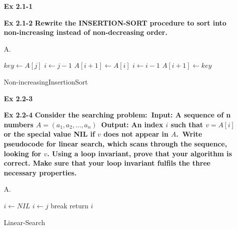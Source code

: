 \documentclass[fontsize=12pt,paper=a4,open=any]{book}
\begin{document}
\begin{enumerate}
	\item[\textbf{Ex 2.1-1}]

	\item[\textbf{Ex 2.1-2}]
		\textbf{Rewrite the INSERTION-SORT procedure to sort into non-increasing instead of non-decreasing order.} \

	\item[A.]
		\begin{algorithm}[H]

			\DontPrintSemicolon

			{
				$key\longleftarrow A[j]$\;
				$i \longleftarrow j-1$\;
				{
					$A[i+ 1] \longleftarrow A[i]$\;
					$i \longleftarrow i-1$\;
				}
				$A[i+ 1] \longleftarrow key$\;
			}

			\caption{Non-increasingInsertionSort}
		\end{algorithm}
	\item[\textbf{Ex 2.2-3}]
	
	\item[\textbf{Ex 2.2-4}]
		\textbf{Consider the searching problem:\
			Input: A sequence of n numbers $A =(a_1, a_2,\dots,a_n)$\
			Output: An index $i$ such that $v=A[i]$ or the special value NIL if $v$ does not appear in $A$.\
			Write pseudocode for linear search, which scans through the sequence, looking for $v$. Using a loop invariant, prove that your algorithm is correct. Make sure that your loop invariant fulfils the three necessary properties.
		}
	
	\item[A.]
		\begin{algorithm}[H]

			\DontPrintSemicolon

			$i \longleftarrow NIL$\;
			{
				{
					$i \longleftarrow j$\;
					break\;
				}
			}
			return $i$

			\caption{Linear-Search}
		\end{algorithm}


\end{enumerate}
\end{document}
